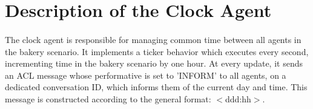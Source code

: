 \documentclass[11pt, a4paper]{article}
\begin{document}
\hfill\break
\section{Description of the Clock Agent}
\paragraph{}
The clock agent is responsible for managing common time between all agents in the bakery scenario. It implements a ticker behavior which executes every second, incrementing time in the bakery scenario by one hour. At every update, it sends an ACL message whose performative is set to 'INFORM' to all agents, on a dedicated conversation ID, which informs them of the current day and time. This message is constructed according to the general format: $<$ddd:hh$>$.
\end{document}
